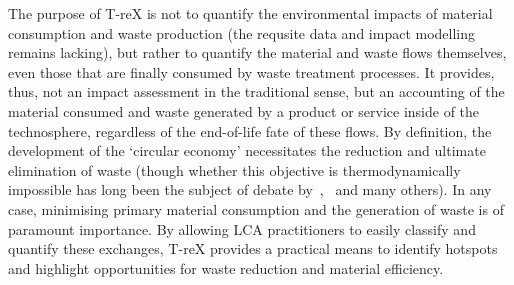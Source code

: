 The purpose of T-reX is not to quantify the environmental impacts of material consumption and waste production (the requsite data and impact modelling remains lacking), but rather to quantify the material and waste flows themselves, even those that are finally consumed by waste treatment processes. It provides, thus, not an impact assessment in the traditional sense, but an accounting of the material consumed and waste generated by a product or service inside of the technosphere, regardless of the end-of-life fate of these flows. By definition, the development of the `circular economy' necessitates the reduction and ultimate elimination of waste (though whether this objective is thermodynamically impossible has long been the subject of debate by~\cite{ayres1998recycling},~\cite{reuter2012recyclinglimits} and many others). In any case, minimising primary material consumption and the generation of waste is of paramount importance. By allowing LCA practitioners to easily classify and quantify these exchanges, T-reX provides a practical means to identify hotspots and highlight opportunities for waste reduction and material efficiency.




